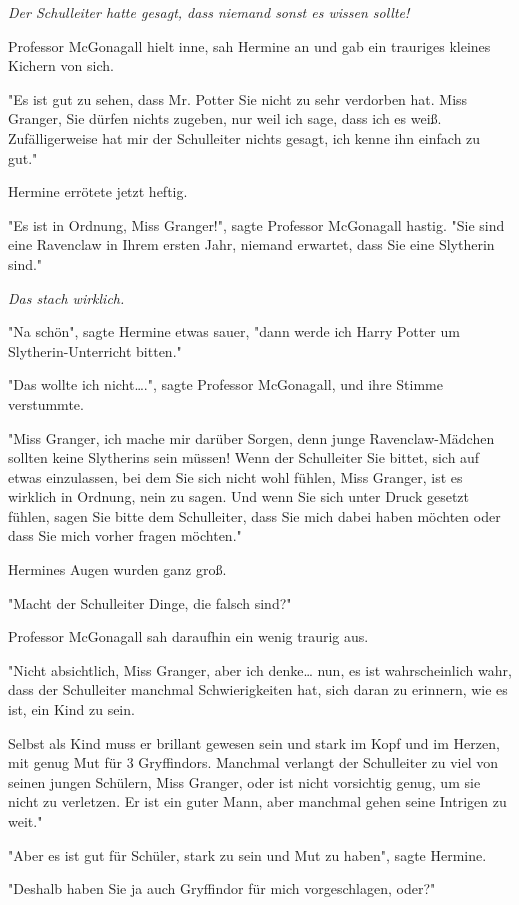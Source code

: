 {\emph{Der Schulleiter hatte gesagt, dass niemand sonst es wissen sollte!}

Professor McGonagall hielt inne, sah Hermine an und gab ein trauriges kleines Kichern von sich.

"Es ist gut zu sehen, dass Mr. Potter Sie nicht zu sehr verdorben hat. Miss Granger, Sie dürfen nichts zugeben, nur weil ich sage, dass ich es weiß. Zufälligerweise hat mir der Schulleiter nichts gesagt, ich kenne ihn einfach zu gut."

Hermine errötete jetzt heftig.

"Es ist in Ordnung, Miss Granger!", sagte Professor McGonagall hastig. "Sie sind eine Ravenclaw in Ihrem ersten Jahr, niemand erwartet, dass Sie eine Slytherin sind."

\emph{Das stach wirklich.}

"Na schön", sagte Hermine etwas sauer, "dann werde ich Harry Potter um Slytherin-Unterricht bitten."

"Das wollte ich nicht….", sagte Professor McGonagall, und ihre Stimme verstummte.

"Miss Granger, ich mache mir darüber Sorgen, denn junge Ravenclaw-Mädchen sollten keine Slytherins sein müssen! Wenn der Schulleiter Sie bittet, sich auf etwas einzulassen, bei dem Sie sich nicht wohl fühlen, Miss Granger, ist es wirklich in Ordnung, nein zu sagen. Und wenn Sie sich unter Druck gesetzt fühlen, sagen Sie bitte dem Schulleiter, dass Sie mich dabei haben möchten oder dass Sie mich vorher fragen möchten."

Hermines Augen wurden ganz groß.

"Macht der Schulleiter Dinge, die falsch sind?"

Professor McGonagall sah daraufhin ein wenig traurig aus.

"Nicht absichtlich, Miss Granger, aber ich denke… nun, es ist wahrscheinlich wahr, dass der Schulleiter manchmal Schwierigkeiten hat, sich daran zu erinnern, wie es ist, ein Kind zu sein.

Selbst als Kind muss er brillant gewesen sein und stark im Kopf und im Herzen, mit genug Mut für 3 Gryffindors. Manchmal verlangt der Schulleiter zu viel von seinen jungen Schülern, Miss Granger, oder ist nicht vorsichtig genug, um sie nicht zu verletzen. Er ist ein guter Mann, aber manchmal gehen seine Intrigen zu weit."

"Aber es ist gut für Schüler, stark zu sein und Mut zu haben", sagte Hermine.

"Deshalb haben Sie ja auch Gryffindor für mich vorgeschlagen, oder?"

}
